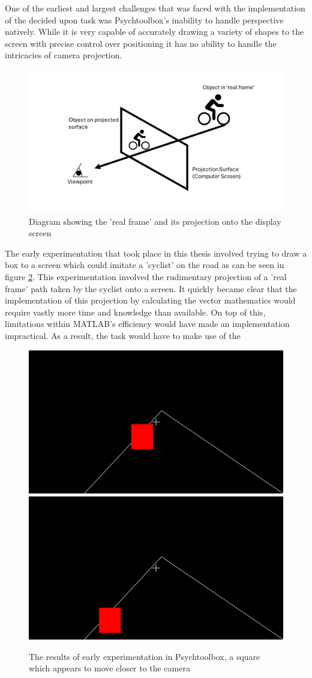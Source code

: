 

One of the earliest and largest challenges that was faced with the implementation of the decided upon task was Psychtoolbox's inability to handle perspective natively. While it is very capable of accurately drawing a variety of shapes to the screen with precise control over positioning it has no ability to handle the intricacies of camera projection.

\begin{figure}[hbt!]
    \centering
    \includegraphics[width=0.75\linewidth]{figures/Projection Diagram.png}
    \caption{Diagram showing the 'real frame' and its projection onto the display screen}
    \label{fig:}
\end{figure}

The early experimentation that took place in this thesis involved trying to draw a box to a screen which could imitate a 'cyclist' on the road as can be seen in figure \ref{fig:EarlyPsychExp}. This experimentation involved the rudimentary projection of a 'real frame' path taken by the cyclist onto a screen. It quickly became clear that the implementation of this projection by calculating the vector mathematics would require vastly more time and knowledge than available. On top of this, limitations within MATLAB's efficiency would have made an implementation impractical. As a result, the task would have to make use of the 

\begin{figure}[hbt!]
    \centering
    \includegraphics[width=0.45\linewidth]{figures/Slide1.png} \hfill
    \includegraphics[width=0.45\linewidth]{figures/Slide2.png}
    \caption{The results of early experimentation in Psychtoolbox, a square which appears to move closer to the camera}
    \label{fig:EarlyPsychExp}
\end{figure}

